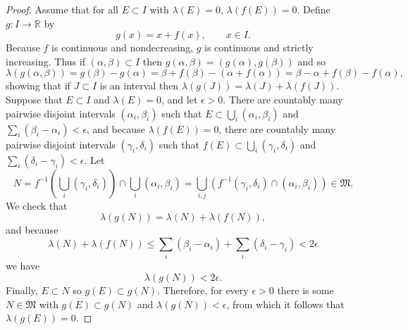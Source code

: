 \documentclass{article}
\theoremstyle{definition}
\begin{document}
\begin{proof}
Assume that for all $E \subset I$ with $\lambda(E)=0$, $\lambda(f(E))=0$. Define $g:I \to \mathbb{R}$ by
\[
g(x)=x+f(x), \qquad x \in I.
\]
Because $f$ is continuous and nondecreasing, $g$ is continuous and strictly increasing. Thus if $(\alpha,\beta) \subset I$ then
$g(\alpha,\beta)=(g(\alpha),g(\beta))$ and so
\[
\lambda(g(\alpha,\beta))=g(\beta)-g(\alpha) = \beta+f(\beta)-(\alpha+f(\alpha))
=\beta-\alpha+f(\beta)-f(\alpha),
\]
showing that if $J \subset I$ is an interval then $\lambda(g(J)) = \lambda(J)+\lambda(f(J))$.
Suppose that $E \subset I$ and $\lambda(E)=0$, and let $\epsilon>0$. There are countably many pairwise disjoint intervals
$(\alpha_i,\beta_i)$ such that $E \subset \bigcup_i (\alpha_i,\beta_i)$ and $\sum_i (\beta_i-\alpha_i)<\epsilon$,
and because $\lambda(f(E))=0$, there are countably many pairwise disjoint intervals
$(\gamma_i,\delta_i)$ such that $f(E) \subset \bigcup_i (\gamma_i,\delta_i)$ and 
$\sum_i (\delta_i-\gamma_i)<\epsilon$. Let
\[
N=f^{-1}\left( \bigcup_i (\gamma_i,\delta_i) \right) \cap \bigcup_i (\alpha_i,\beta_i)
=\bigcup_{i,j} (f^{-1}(\gamma_i,\delta_i) \cap (\alpha_i,\beta_i)) \in \mathfrak{M}.
\]
We check that 
\[
\lambda(g(N)) = \lambda(N)+\lambda(f(N)),
\]
and because
\[
 \lambda(N)+\lambda(f(N)) \leq \sum_i (\beta_i-\alpha_i)+\sum_i (\delta_i-\gamma_i)<2\epsilon
\]
we have
\[
\lambda(g(N)) < 2\epsilon.
\]
Finally, $E \subset N$ so $g(E) \subset g(N)$.
Therefore, for every $\epsilon>0$ there is some $N \in \mathfrak{M}$ with 
$g(E) \subset g(N)$ and $\lambda(g(N))<\epsilon$, from which it follows that $\lambda(g(E))=0$.


\end{proof}
\end{document}
